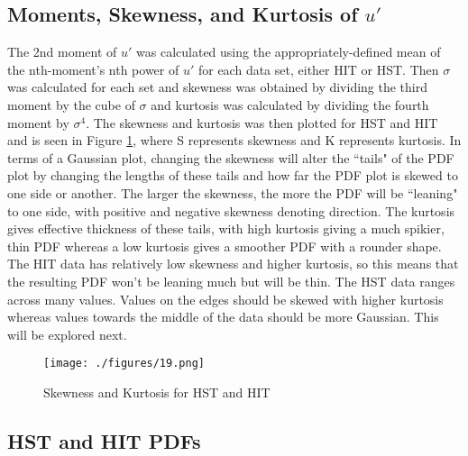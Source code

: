 \documentclass[12pt]{article}
\begin{document}
\subsection{Moments, Skewness, and Kurtosis of $u'$}
The 2nd moment of $u'$ was calculated using the appropriately-defined mean of the nth-moment's nth power of $u'$ for each data set, either HIT or HST. Then $\sigma$ was calculated for each set and skewness was obtained by dividing the third moment by the cube of $\sigma$ and kurtosis was calculated by dividing the fourth moment by $\sigma^4$. The skewness and kurtosis was then plotted for HST and HIT and is seen in Figure \ref{fig:19}, where S represents skewness and K represents kurtosis. In terms of a Gaussian plot, changing the skewness will alter the ``tails" of the PDF plot by changing the lengths of these tails and how far the PDF plot is skewed to one side or another. The larger the skewness, the more the PDF will be ``leaning" to one side, with positive and negative skewness denoting direction. The kurtosis gives effective thickness of these tails, with high kurtosis giving a much spikier, thin PDF whereas a low kurtosis gives a smoother PDF with a rounder shape. The HIT data has relatively low skewness and higher kurtosis, so this means that the resulting PDF won't be leaning much but will be thin. The HST data ranges across many values. Values on the edges should be skewed with higher kurtosis whereas values towards the middle of the data should be more Gaussian. This will be explored next. 

\begin{figure}
	\centering
	\texttt{[image: ./figures/19.png]}
	\caption{Skewness and Kurtosis for HST and HIT}
	\label{fig:19}
\end{figure}


\subsection{HST and HIT PDFs}























%
%
\end{document}
